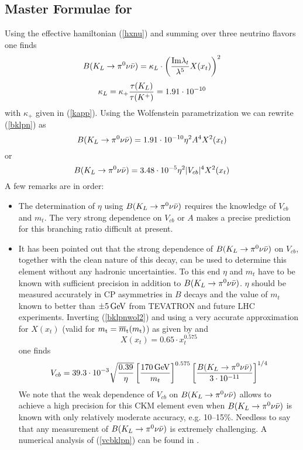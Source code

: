 \subsection{Master Formulae for \klpnn}
\label{sec:Kpnn:MasterKL}
Using the effective hamiltonian (\ref{hxnu}) and summing over three
neutrino flavors one finds
\begin{equation}\label{bklpn}
B(K_L\to\pi^0\nu\bar\nu)=\kappa_L\cdot\left({{\rm Im} \lambda_t\over\lambda^5}X(x_t)
  \right)^2
\end{equation}
\begin{equation}\label{kapl}
\kappa_L=\kappa_+ {\tau(K_L)\over\tau(K^+)}=1.91\cdot 10^{-10}
\end{equation}
with $\kappa_+$ given in (\ref{kapp}). Using the Wolfenstein
parametrization we can rewrite (\ref{bklpn}) as
\begin{equation}\label{bklpnwol1}
B(K_L \to \pi^0\nu\bar\nu)=1.91\cdot 10^{-10} \eta^2 A^4 X^2(x_t)
\end{equation}
or
\begin{equation}\label{bklpnwol2}
B(K_L \to \pi^0\nu\bar\nu)=3.48\cdot 10^{-5} \eta^2 |V_{cb}|^4 X^2(x_t)
\end{equation}
A few remarks are in order:
\begin{itemize}
\item
The determination of $\eta$ using $B(K_L \to \pi^0\nu\bar\nu)$ requires the knowledge
of $V_{cb}$ and $m_t$. The very strong dependence on $V_{cb}$ or $A$
makes a precise prediction for this branching ratio difficult at
present.
\item
It has been pointed out \cite{buras:94b} that the strong
dependence of $B(K_L \to \pi^0\nu\bar\nu)$ on $V_{cb}$, together with the clean nature of
this decay, can be used to determine this element without any hadronic
uncertainties. To this end $\eta$ and $m_t$ have to be known with
sufficient precision in addition to $B(K_L \to \pi^0\nu\bar\nu)$. $\eta$ should be
measured accurately in CP asymmetries in $B$ decays and the value of
$m_t$ known to better than $\pm 5\, {\rm GeV}$ from TEVATRON and future LHC
experiments. Inverting (\ref{bklpnwol2}) and using a very accurate
approximation for $X(x_t)$ (valid for $m_{\rm t} = \overline{m}_{\rm t}(m_{\rm t})$)
as given by  and 
\begin{equation}\label{xxappr}
X(x_t)=0.65\cdot x_t^{0.575}
\end{equation}
one finds
\begin{equation}\label{vcbklpn}
V_{cb}=39.3\cdot 10^{-3} \sqrt{\frac{0.39}{\eta}}
\left[\frac{170\, {\rm GeV}}{m_t}\right]^{0.575}
\left[\frac{B(K_L \to \pi^0\nu\bar\nu)}{3\cdot 10^{-11}}\right]^{1/4}
\end{equation}
We note that the weak dependence of $V_{cb}$ on $B(K_L \to \pi^0\nu\bar\nu)$ allows
to achieve a high precision for this CKM element even when $B(K_L \to \pi^0\nu\bar\nu)$
is known with only relatively moderate accuracy, e.g. 10--15\%.
Needless to say that any measurement of $B(K_L \to \pi^0\nu\bar\nu)$ is extremely
challenging. A numerical analysis of (\ref{vcbklpn}) can be found in
\cite{buras:94b}.
\end{itemize}

